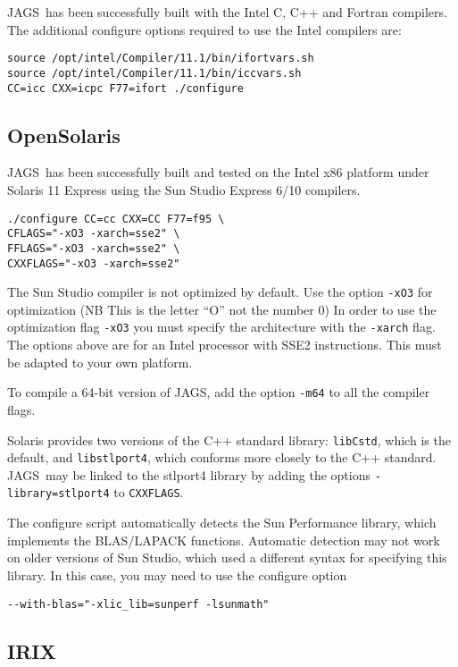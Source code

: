 \documentclass[11pt, a4paper, titlepage]{article}
\newcommand{\JAGS}{\textsf{JAGS}}
\begin{document}
\JAGS\ has been successfully built with the Intel C, C++ and Fortran
compilers.  The additional configure options required to use the Intel
compilers are:
\begin{verbatim}
source /opt/intel/Compiler/11.1/bin/ifortvars.sh
source /opt/intel/Compiler/11.1/bin/iccvars.sh
CC=icc CXX=icpc F77=ifort ./configure 
\end{verbatim}

\subsection{OpenSolaris}

\JAGS\ has been successfully built and tested on the Intel x86
platform under Solaris 11 Express using the Sun Studio Express 6/10
compilers.
\begin{verbatim}
./configure CC=cc CXX=CC F77=f95 \
CFLAGS="-xO3 -xarch=sse2" \
FFLAGS="-xO3 -xarch=sse2" \
CXXFLAGS="-xO3 -xarch=sse2"
\end{verbatim}
The Sun Studio compiler is not optimized by default. Use the option
\verb+-xO3+ for optimization (NB This is the letter ``O'' not the
number 0) In order to use the optimization flag \verb+-xO3+ you
must specify the architecture with the \verb+-xarch+ flag. The options
above are for an Intel processor with SSE2 instructions. This must be
adapted to your own platform.

To compile a 64-bit version of JAGS, add the option \verb+-m64+ to
all the compiler flags.

Solaris provides two versions of the C++ standard library:
\texttt{libCstd}, which is the default, and \texttt{libstlport4},
which conforms more closely to the C++ standard. \JAGS\ may be linked
to the stlport4 library by adding the options
\verb+-library=stlport4+ to \verb+CXXFLAGS+. 

The configure script automatically detects the Sun Performance library,
which implements the BLAS/LAPACK functions.  Automatic detection may
not work on older versions of Sun Studio, which used a different syntax
for specifying this library.  In this case, you may need to use the
configure option
\begin{verbatim}
--with-blas="-xlic_lib=sunperf -lsunmath"
\end{verbatim}

\subsection{IRIX}
\end{document}
